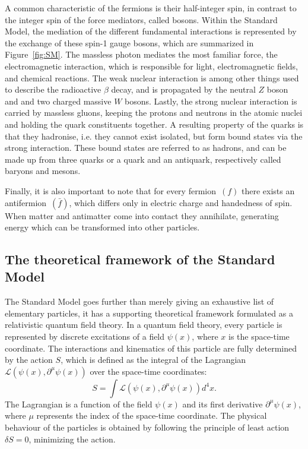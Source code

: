 A common characteristic of the fermions is their half-integer spin, in contrast to the integer spin of the force mediators, called bosons. Within the Standard Model, the mediation of the different fundamental interactions is represented by the exchange of these spin-1 gauge bosons, which are summarized in Figure~\ref{fig:SM}. The massless photon mediates the most familiar force, the electromagnetic interaction, which is responsible for light, electromagnetic fields, and chemical reactions. The weak nuclear interaction is among other things used to describe the radioactive $\beta$ decay, and is propagated by the neutral $Z$ boson and and two charged massive $W$ bosons. Lastly, the strong nuclear interaction is carried by massless gluons, keeping the protons and neutrons in the atomic nuclei and holding the quark constituents together. A resulting property of the quarks is that they hadronise, i.e. they cannot exist isolated, but form bound states via the strong interaction. These bound states are referred to as hadrons, and can be made up from three quarks or a quark and an antiquark, respectively called baryons and mesons.

Finally, it is also important to note that for every fermion~$(f)$ there exists an antifermion~$(\bar{f})$, which differs only in electric charge and handedness of spin. When matter and antimatter come into contact they annihilate, generating energy which can be transformed into other particles.

\subsection{The theoretical framework of the Standard Model}

The Standard Model goes further than merely giving an exhaustive list of elementary particles, it has a supporting theoretical framework formulated as a relativistic quantum field theory. In a quantum field theory, every particle is represented by discrete excitations of a field $\psi(x)$, where $x$ is the space-time coordinate. The interactions and kinematics of this particle are fully determined by the action $S$, which is defined as the integral of the Lagrangian  $\mathcal{L}(\psi(x), \partial^{\mu}\psi(x))$ over the space-time coordinates:
\begin{equation}
 S = \int\mathcal{L}(\psi(x), \partial^{\mu}\psi(x))d^4x.
\end{equation}
The Lagrangian  is a function of the field $\psi(x)$ and its first derivative $\partial^{\mu}\psi(x)$, where $\mu$ represents the index of the space-time coordinate. The physical behaviour of the particles is obtained by following the principle of least action $\delta S =0$, minimizing the action.

